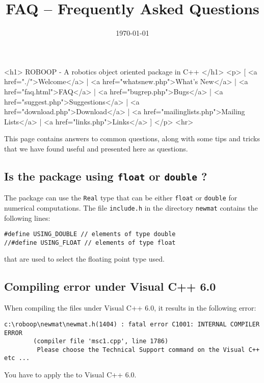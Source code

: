 \documentclass[letterpaper]{article}
\begin{document}
\title{FAQ -- Frequently Asked Questions}
\author{}
\date{\today}
\begin{rawhtml}
    <h1>
      ROBOOP - A robotics object oriented package in C++
    </h1>
    <p>
      [ <a href="./">Welcome</a> | 
      <a href="whatsnew.php">What's New</a> | 
      <a href="faq.html">FAQ</a> | 
      <a href="bugrep.php">Bugs</a> | 
      <a href="suggest.php">Suggestions</a> | 
      <a href="download.php">Download</a> | 
      <a href="mailinglists.php">Mailing Lists</a> | 
      <a href="links.php">Links</a> ]
    </p>
  <hr>
\end{rawhtml}
\maketitle

This page contains answers to common questions, along with some tips
and tricks that we have found useful and presented here as questions.

\tableofcontents

\subsection{Is the package using \texttt{float} or \texttt{double} ?}

The package can use the \texttt{Real} type that can be either
\texttt{float} or \texttt{double} for numerical computations. The file
\texttt{include.h} in the directory \texttt{newmat} contains the
following lines:
\begin{verbatim}
#define USING_DOUBLE // elements of type double
//#define USING_FLOAT // elements of type float
\end{verbatim}
that are used to select the floating point type used.

\subsection{Compiling error under \textsf{Visual C++ 6.0}}

When compiling the files under \textsf{Visual C++ 6.0}, it results in
the following error:
\begin{verbatim}
c:\roboop\newmat\newmat.h(1404) : fatal error C1001: INTERNAL COMPILER ERROR
        (compiler file 'msc1.cpp', line 1786)
         Please choose the Technical Support command on the Visual C++ etc ...
\end{verbatim}
You have to apply the 
to \textsf{Visual C++ 6.0}.
\end{document}
